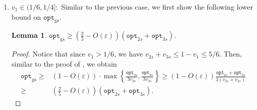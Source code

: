 \documentclass[10pt,a4paper]{amsart}
\renewcommand{\epsilon}{\varepsilon} %
\newtheorem{lemma}[theorem]{Lemma}
\theoremstyle{definition}
\newcommand{\alg}{\mathtt{opt}_{\mathrm{gs}}}
\newcommand{\opt}{\mathtt{opt}}
\newcommand{\opttwos}{\mathtt{opt}_{2s}}
\newcommand{\optthrees}{\mathtt{opt}_{3s}}
\newcommand{\vtwos}{v_{2s}}
\newcommand{\vthrees}{v_{3s}}
\begin{document}
\begin{enumerate}
\begin{proof}
        Adding \eqref{eqn:4a}, \eqref{eqn:4b}, \eqref{eqn:4c} and \eqref{eqn:4d}, we have that
        \[ 151\alg \ge (1-O(\epsilon))(32\opt_1 + 32\opt_2 + 32\opt_3 + 32\opt_L) = (32-O(\epsilon))\opt,\]
        and are done.
    \end{proof}

    






    
    



    \item $v_1 \in (1/6, 1/4]:$ Similar to the previous case, we first show the following lower bound on $\alg$.

    \begin{lemma}
    \label{lem:optgslbcase2}
        $\displaystyle\alg \ge \left(\frac{2}{5}-O(\epsilon)\right)(\opttwos+\optthrees)$.
    \end{lemma}
    \begin{proof}
        Notice that since $v_1>1/6$, we have $\vtwos+\vthrees \le 1-v_1\le 5/6$. Then, similar to the proof of , we obtain
        \begin{align*}
            \alg \ge& (1-O(\epsilon))\cdot \max\left\{\frac{\opttwos}{3\vtwos},\frac{\optthrees}{3\vthrees}\right\} \ge (1-O(\epsilon))\frac{\opttwos+\optthrees}{3(\vtwos+\vthrees)}\\ \ge& \left(\frac{2}{5}-O(\epsilon)\right)(\opttwos+\optthrees).
        \end{align*}
    \end{proof}


\end{enumerate}
\end{document}
